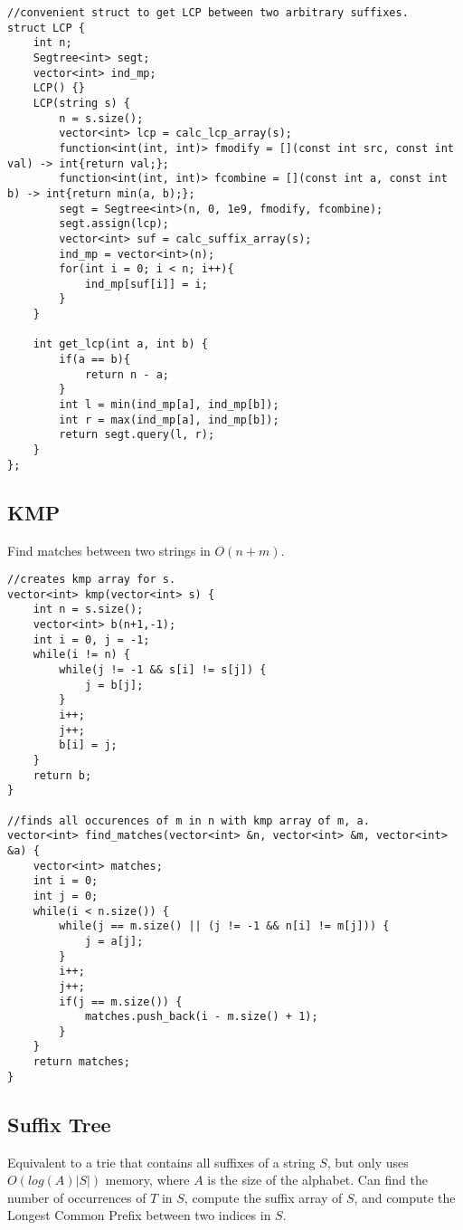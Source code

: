 \documentclass[8pt, headheight=10pt, a4paper]{article}
\begin{document}
\begin{multicols*}{3}
\begin{lstlisting}
//convenient struct to get LCP between two arbitrary suffixes. 
struct LCP {
    int n;
    Segtree<int> segt;
    vector<int> ind_mp;
    LCP() {}
    LCP(string s) {
        n = s.size();
        vector<int> lcp = calc_lcp_array(s);
        function<int(int, int)> fmodify = [](const int src, const int val) -> int{return val;};
        function<int(int, int)> fcombine = [](const int a, const int b) -> int{return min(a, b);};
        segt = Segtree<int>(n, 0, 1e9, fmodify, fcombine); 
        segt.assign(lcp);
        vector<int> suf = calc_suffix_array(s);
        ind_mp = vector<int>(n);
        for(int i = 0; i < n; i++){
            ind_mp[suf[i]] = i;
        }
    }

    int get_lcp(int a, int b) {
        if(a == b){
            return n - a;
        }
        int l = min(ind_mp[a], ind_mp[b]);
        int r = max(ind_mp[a], ind_mp[b]);
        return segt.query(l, r);
    }
};
\end{lstlisting}

\subsection{KMP}
Find matches between two strings in $O(n + m)$.
\begin{lstlisting}
//creates kmp array for s. 
vector<int> kmp(vector<int> s) {
    int n = s.size();
    vector<int> b(n+1,-1);
    int i = 0, j = -1;
    while(i != n) {
        while(j != -1 && s[i] != s[j]) {
            j = b[j];
        }
        i++;
        j++;
        b[i] = j;
    }
    return b;
}

//finds all occurences of m in n with kmp array of m, a. 
vector<int> find_matches(vector<int> &n, vector<int> &m, vector<int> &a) {
    vector<int> matches;
    int i = 0;
    int j = 0;
    while(i < n.size()) {
        while(j == m.size() || (j != -1 && n[i] != m[j])) {
            j = a[j];
        }
        i++;
        j++;
        if(j == m.size()) {
            matches.push_back(i - m.size() + 1);
        }
    }
    return matches;
}
\end{lstlisting}

\subsection{Suffix Tree}
Equivalent to a trie that contains all suffixes of a string $S$, but only uses $O(log(A)|S|)$ memory, where $A$ is the size of the alphabet. Can find the number of occurrences of $T$ in $S$, compute the suffix array of $S$, and compute the Longest Common Prefix between two indices in $S$. 


\end{multicols*}
\end{document}
